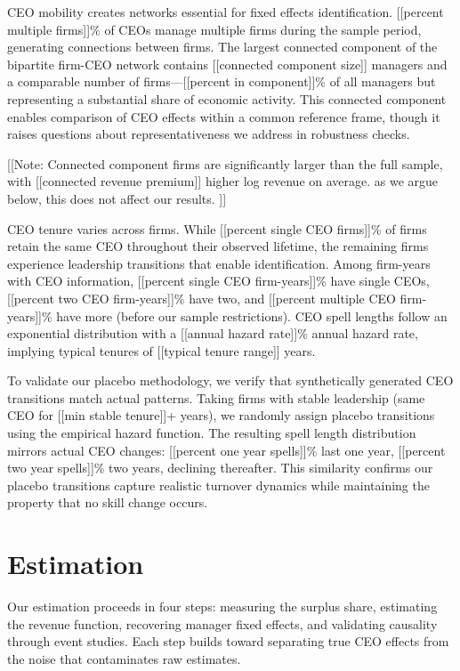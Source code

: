 \documentclass[11pt,a4paper]{article}
\begin{document}
CEO mobility creates networks essential for fixed effects identification. [[percent multiple firms]]\% of CEOs manage multiple firms during the sample period, generating connections between firms. The largest connected component of the bipartite firm-CEO network contains [[connected component size]] managers and a comparable number of firms—[[percent in component]]\% of all managers but representing a substantial share of economic activity. This connected component enables comparison of CEO effects within a common reference frame, though it raises questions about representativeness we address in robustness checks.

[[Note: Connected component firms are significantly larger than the full sample, with [[connected revenue premium]] higher log revenue on average. as we argue below, this does not affect our results. ]]

CEO tenure varies across firms. While [[percent single CEO firms]]\% of firms retain the same CEO throughout their observed lifetime, the remaining firms experience leadership transitions that enable identification. Among firm-years with CEO information, [[percent single CEO firm-years]]\% have single CEOs, [[percent two CEO firm-years]]\% have two, and [[percent multiple CEO firm-years]]\% have more (before our sample restrictions). CEO spell lengths follow an exponential distribution with a [[annual hazard rate]]\% annual hazard rate, implying typical tenures of [[typical tenure range]] years.

To validate our placebo methodology, we verify that synthetically generated CEO transitions match actual patterns. Taking firms with stable leadership (same CEO for [[min stable tenure]]+ years), we randomly assign placebo transitions using the empirical hazard function. The resulting spell length distribution mirrors actual CEO changes: [[percent one year spells]]\% last one year, [[percent two year spells]]\% two years, declining thereafter. This similarity confirms our placebo transitions capture realistic turnover dynamics while maintaining the property that no skill change occurs.



\section{Estimation}

Our estimation proceeds in four steps: measuring the surplus share, estimating the revenue function, recovering manager fixed effects, and validating causality through event studies. Each step builds toward separating true CEO effects from the noise that contaminates raw estimates.
\end{document}
